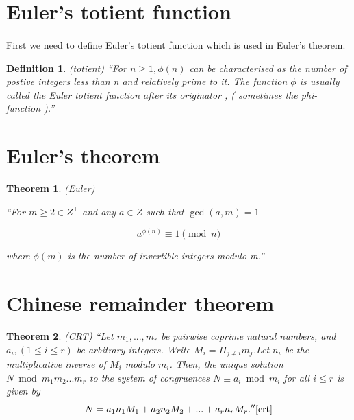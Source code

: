 \documentclass[thesis=B,english]{FITthesis}[2012/10/20]
\newtheorem{theorem}{Theorem}
\newtheorem{definition}{Definition}
\begin{document}
{%

\section{Euler's totient function}
\paragraph*{}{
First we need to define Euler's totient function which is used in Euler's theorem.
}
\begin{definition}(totient)
``For \(n \ge 1, \phi(n)\) can be characterised as the number of postive integers less than n and relatively prime to it. The function \(\phi\) is usually called the Euler totient function after its originator , ( sometimes
the phi-function ).''\cite{totient}
\end{definition}







\section{Euler's theorem}{
\begin{theorem}(Euler){
``For \(m \ge 2 \in Z^+\) and any \(a \in Z\) such that \(\gcd(a, m) = 1\)

\[  a^{\phi(n)} \equiv 1 \pmod n\]

where \(\phi(m)\) is the number of invertible integers modulo m.''\cite{euler}
}


\end{theorem}


\section{Chinese remainder theorem}

\begin{theorem}(CRT)
``Let \(m_1,... , m_r\) be pairwise coprime natural numbers, and \(a_i, (1 \le i \le r)\) be arbitrary integers. Write \(M_i = \Pi_{j \not= i} m_j \).Let \(n_i\) be the multiplicative inverse of \(M_i\) modulo \(m_i\).
Then, the unique solution \(N \bmod m_1m_2 ... m_r\) to the
system of congruences \(N \equiv a_i \bmod m_i\) for all \(i \le r\) is
given by
\[N = a_1n_1M_1 + a_2n_2M_2 + ... + a_rn_rM_r. ''\cite{crt}\]


\end{theorem}}}
\end{document}
